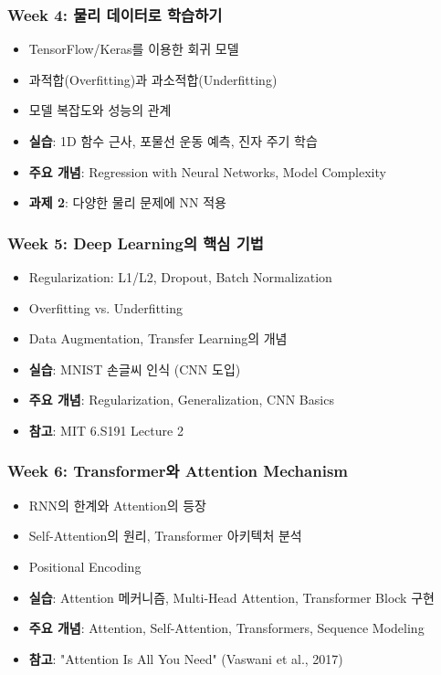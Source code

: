 \documentclass[11pt,a4paper]{article}
\begin{document}
\subsubsection*{Week 4: 물리 데이터로 학습하기}
\begin{itemize}[noitemsep]
    \item TensorFlow/Keras를 이용한 회귀 모델
    \item 과적합(Overfitting)과 과소적합(Underfitting)
    \item 모델 복잡도와 성능의 관계
    \item \textbf{실습}: 1D 함수 근사, 포물선 운동 예측, 진자 주기 학습
    \item \textbf{주요 개념}: Regression with Neural Networks, Model Complexity
    \item \textbf{과제 2}: 다양한 물리 문제에 NN 적용
\end{itemize}

\subsubsection*{Week 5: Deep Learning의 핵심 기법}
\begin{itemize}[noitemsep]
    \item Regularization: L1/L2, Dropout, Batch Normalization
    \item Overfitting vs. Underfitting
    \item Data Augmentation, Transfer Learning의 개념
    \item \textbf{실습}: MNIST 손글씨 인식 (CNN 도입)
    \item \textbf{주요 개념}: Regularization, Generalization, CNN Basics
    \item \textbf{참고}: MIT 6.S191 Lecture 2
\end{itemize}

\subsubsection*{Week 6: Transformer와 Attention Mechanism}
\begin{itemize}[noitemsep]
    \item RNN의 한계와 Attention의 등장
    \item Self-Attention의 원리, Transformer 아키텍처 분석
    \item Positional Encoding
    \item \textbf{실습}: Attention 메커니즘, Multi-Head Attention, Transformer Block 구현
    \item \textbf{주요 개념}: Attention, Self-Attention, Transformers, Sequence Modeling
    \item \textbf{참고}: "Attention Is All You Need" (Vaswani et al., 2017)
\end{itemize}
\end{document}
